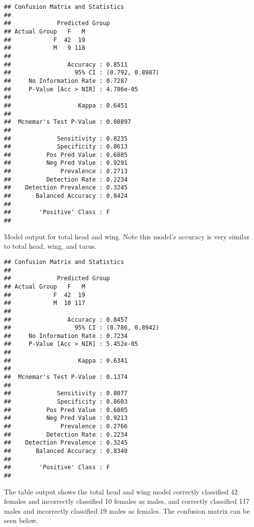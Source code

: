 \documentclass[
]{article}
\begin{document}
\begin{verbatim}
## Confusion Matrix and Statistics
## 
##             Predicted Group
## Actual Group   F   M
##            F  42  19
##            M   9 118
##                                          
##                Accuracy : 0.8511         
##                  95% CI : (0.792, 0.8987)
##     No Information Rate : 0.7287         
##     P-Value [Acc > NIR] : 4.786e-05      
##                                          
##                   Kappa : 0.6451         
##                                          
##  Mcnemar's Test P-Value : 0.08897        
##                                          
##             Sensitivity : 0.8235         
##             Specificity : 0.8613         
##          Pos Pred Value : 0.6885         
##          Neg Pred Value : 0.9291         
##              Prevalence : 0.2713         
##          Detection Rate : 0.2234         
##    Detection Prevalence : 0.3245         
##       Balanced Accuracy : 0.8424         
##                                          
##        'Positive' Class : F              
## 
\end{verbatim}

Model output for total head and wing. Note this model's accuracy is very
similar to total head, wing, and tarus.

\begin{verbatim}
## Confusion Matrix and Statistics
## 
##             Predicted Group
## Actual Group   F   M
##            F  42  19
##            M  10 117
##                                          
##                Accuracy : 0.8457         
##                  95% CI : (0.786, 0.8942)
##     No Information Rate : 0.7234         
##     P-Value [Acc > NIR] : 5.452e-05      
##                                          
##                   Kappa : 0.6341         
##                                          
##  Mcnemar's Test P-Value : 0.1374         
##                                          
##             Sensitivity : 0.8077         
##             Specificity : 0.8603         
##          Pos Pred Value : 0.6885         
##          Neg Pred Value : 0.9213         
##              Prevalence : 0.2766         
##          Detection Rate : 0.2234         
##    Detection Prevalence : 0.3245         
##       Balanced Accuracy : 0.8340         
##                                          
##        'Positive' Class : F              
## 
\end{verbatim}

The table output shows the total head and wing model correctly
classified 42 females and incorrectly classified 10 females as males,
and correctly classified 117 males and incorrectly classified 19 males
as females. The confusion matrix can be seen below.
\end{document}
